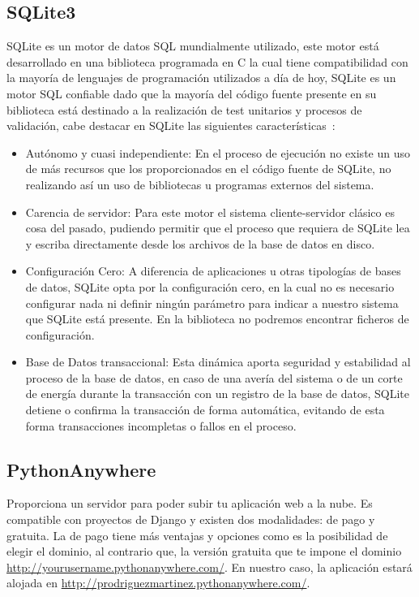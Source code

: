 \documentclass[a4paper, 12pt]{book}
\begin{document}
\subsection{SQLite3}
SQLite es un motor de datos SQL mundialmente utilizado, este motor está desarrollado en una biblioteca programada en C la cual tiene compatibilidad con la mayoría de lenguajes de programación utilizados a día de hoy, SQLite es un motor SQL confiable dado que la mayoría del código fuente presente en su biblioteca está destinado a la realización de test unitarios y procesos de validación, cabe destacar en SQLite las siguientes características~\cite{sqlite}: 
\begin{itemize}
    \item Autónomo y cuasi independiente: En el proceso de ejecución no existe un uso de más recursos que los proporcionados en el código fuente de SQLite, no realizando así un uso de bibliotecas u programas externos del sistema.
\item Carencia de servidor: Para este motor el sistema cliente-servidor clásico es cosa del pasado, pudiendo permitir que el proceso que requiera de SQLite lea y escriba directamente desde los archivos de la base de datos en disco. 
\item Configuración Cero: A diferencia de aplicaciones u otras tipologías de bases de datos, SQLite opta por la configuración cero, en la cual no es necesario configurar nada ni definir ningún parámetro para indicar a nuestro sistema que SQLite está presente. En la biblioteca no podremos encontrar ficheros de configuración.
\item Base de Datos transaccional: Esta dinámica aporta seguridad y estabilidad al proceso de la base de datos, en caso de una avería del sistema o de un corte de energía durante la transacción con un registro de la base de datos, SQLite detiene o confirma la transacción de forma automática, evitando de esta forma transacciones incompletas o fallos en el proceso.

\end{itemize}
\subsection{PythonAnywhere}
Proporciona un servidor  para poder subir tu aplicación web a la nube. Es compatible con proyectos de Django y existen dos modalidades: de pago y gratuita. La de pago tiene más ventajas y opciones como es la posibilidad de elegir el dominio, al contrario que, la versión gratuita que te impone el dominio \url{http://yourusername.pythonanywhere.com/}. En nuestro caso, la aplicación estará alojada en \url{http://prodriguezmartinez.pythonanywhere.com/}.
\end{document}
